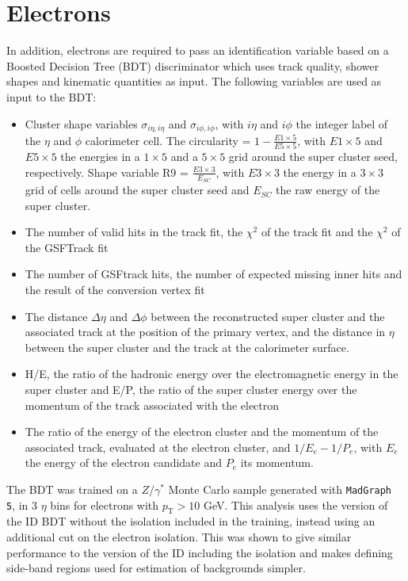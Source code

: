 \section{Electrons}

In addition, electrons are required to pass an identification variable based on a Boosted Decision Tree (BDT) 
discriminator which uses track quality, shower shapes and kinematic quantities as input.
The following variables are used as input to the BDT:  ~\cite{cmsElectron}
\begin{itemize}
\item Cluster shape variables $\sigma_{i\eta,i\eta}$ and $\sigma_{i\phi,i\phi}$, with $i\eta$ and $i\phi$ the integer
label of the $\eta$ and $\phi$ calorimeter cell. The circularity =  $1 -\frac{E1\times5}{E5\times5}$, with
$E1\times5$ and $E5\times5$ the energies in a $1\times5$ and a $5\times5$ grid around the super cluster seed,
respectively. Shape variable R9 = $\frac{E3\times3}{E_{SC}}$, with $E3\times3$ the energy in a $3\times3$ grid
of cells around the super cluster seed and $E_{SC}$ the raw energy of the super cluster.
\item The number of valid hits in the track fit, the $\chi^2$ of the track fit and the $\chi^2$ of the GSFTrack fit
\item The number of GSFtrack hits, the number of expected missing inner hits and the result of the conversion vertex fit
\item The distance $\Delta \eta$ and $\Delta \phi$ between the reconstructed super cluster and the associated track at the position of the primary vertex, and the distance in $\eta$ between the super cluster and the track at the calorimeter surface.
\item H/E, the ratio of the hadronic energy over the electromagnetic energy in the super cluster and E/P, the ratio of the super cluster energy over the momentum of the track associated with the electron 
\item The ratio of the energy of the electron cluster and the momentum of the associated track, evaluated at the electron cluster,
 and $1/E_e - 1/P_e$, with $E_e$ the energy of the electron candidate and $P_e$ its momentum.
\end{itemize}
The BDT was trained on a $Z/\gamma^{*}$ Monte Carlo sample generated with
\texttt{MadGraph 5}, in 3 $\eta$ bins for electrons with $p_{\text{T}}>10$ GeV.
This analysis uses the version of the ID BDT without the isolation included in
the training, instead using an additional cut on the electron isolation. This
was shown to give similar performance to the version of the ID including the
isolation and makes defining side-band regions used for estimation of
backgrounds simpler.

